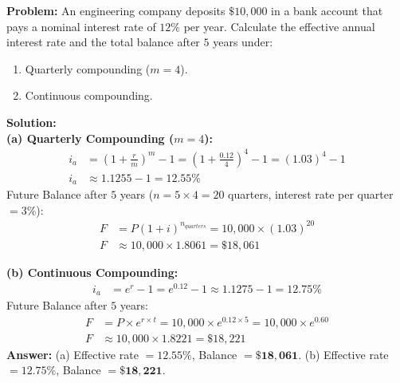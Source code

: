 \documentclass[12pt,a4paper]{article}
\begin{document}
\begin{tcolorbox}[examplebox, title={Example 1: Nominal vs. Effective Interest}]
\textbf{Problem:} An engineering company deposits $\$10,000$ in a bank account that pays a nominal interest rate of $12\%$ per year. Calculate the effective annual interest rate and the total balance after $5$ years under:
\begin{enumerate}[label=\alph*., leftmargin=*, itemsep=2pt, topsep=2pt]
  \item Quarterly compounding ($m = 4$).
  \item Continuous compounding.
\end{enumerate}
\textbf{Solution:}\\[4pt]
\textbf{(a) Quarterly Compounding ($m = 4$):}
\begin{align*}
  i_a &= \left( 1 + \frac{r}{m} \right)^m - 1 = \left( 1 + \frac{0.12}{4} \right)^4 - 1 = (1.03)^4 - 1 \\
  i_a &\approx 1.1255 - 1 = 12.55\%
\end{align*}
Future Balance after $5$ years ($n = 5 \times 4 = 20$ quarters, interest rate per quarter $= 3\%$):
\begin{align*}
  F &= P(1 + i)^{n_{quarters}} = 10,000 \times (1.03)^{20} \\
  F &\approx 10,000 \times 1.8061 = \$18,061
\end{align*}

\textbf{(b) Continuous Compounding:}
\begin{align*}
  i_a &= e^r - 1 = e^{0.12} - 1 \approx 1.1275 - 1 = 12.75\%
\end{align*}
Future Balance after $5$ years:
\begin{align*}
  F &= P \times e^{r \times t} = 10,000 \times e^{0.12 \times 5} = 10,000 \times e^{0.60} \\
  F &\approx 10,000 \times 1.8221 = \$18,221
\end{align*}
\textbf{Answer:} (a) Effective rate $= \mathbf{12.55\%}$, Balance $= \mathbf{\$18,061}$. (b) Effective rate $= \mathbf{12.75\%}$, Balance $= \mathbf{\$18,221}$.
\end{tcolorbox}
\end{document}
